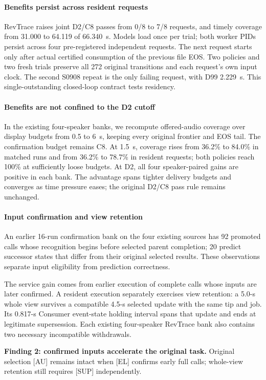 \paragraph{Benefits persist across resident requests}
RevTrace raises joint D2/C8 passes from 0/8 to 7/8 requests, and timely
coverage from 31.000 to 64.119 of 66.340~s. Models load once per trial;
both worker PIDs persist across four pre-registered independent requests.
The next request starts only after actual certified consumption of the
previous file EOS. Two policies and two fresh trials preserve all 272
original transitions and each request's own input clock. The second
S0908 repeat is the only failing request, with D99 2.229~s. This single-outstanding closed-loop contract
tests residency.

\paragraph{Benefits are not confined to the D2 cutoff}
In the existing four-speaker banks, we recompute offered-audio coverage over display budgets
from 0.5 to 6~s, keeping every original frontier and EOS tail.
The confirmation budget remains C8.
At 1.5~s, coverage rises from 36.2\% to 84.0\% in matched runs and
from 36.2\% to 78.7\% in resident requests; both policies reach 100\%
at sufficiently loose budgets. At D2, all four speaker-paired gains
are positive in each bank. The advantage spans tighter delivery budgets
and converges as time pressure eases; the original D2/C8 pass rule remains
unchanged.

\paragraph{Input confirmation and view retention}
An earlier 16-run confirmation bank on the four existing sources
has 92 promoted calls whose recognition
begins before selected parent completion; 20 predict successor states
that differ from their original selected results. These observations
separate input eligibility from prediction correctness.

The service gain comes from earlier execution of complete
calls whose inputs are later confirmed. A resident execution separately
exercises view retention: a 5.0-s whole view survives a compatible 4.5-s
selected update with the same tip and job. Its 0.817-s Consumer event-state
holding interval spans that update and ends at legitimate supersession.
Each existing four-speaker RevTrace bank also contains two necessary
incompatible withdrawals.
\par\noindent\textbf{Finding 2: confirmed inputs accelerate the original task.}
Original selection [AU] remains intact when [EL] confirms early full calls;
whole-view retention still requires [SUP] independently.
